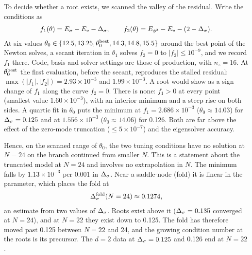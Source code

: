 To decide whether a root exists, we scanned the valley of the residual. Write the conditions as
\begin{equation}
 f_1(\theta)=E_\sigma-E_v-\Delta_\sigma,\qquad f_2(\theta)=E_{\phi^3}-E_v-(2-\Delta_\sigma).
\end{equation}
At six values $\theta_0\in\{12.5,13.25,\theta_0^{\rm best},14.3,14.8,15.5\}$ around the best point of the Newton solves,
a secant iteration in $\theta_1$ solves $f_2=0$ to $|f_2|\le10^{-9}$, and we record $f_1$ there. Code, basis and solver
settings are those of production, with $n_z=16$. At $\theta_0^{\rm best}$ the first evaluation, before the secant,
reproduces the stalled residual: $\max(|f_1|,|f_2|)=2.93\times10^{-3}$ and $1.99\times10^{-3}$. A root would show as a
sign change of $f_1$ along the curve $f_2=0$. There is none: $f_1>0$ at every point (smallest value
$1.60\times10^{-3}$), with an interior minimum and a steep rise on both sides. A quartic fit in $\theta_0$ puts the
minimum at $f_1=2.686\times10^{-3}$ ($\theta_0\approx14.03$) for $\Delta_\sigma=0.125$ and at $1.556\times10^{-3}$
($\theta_0\approx14.06$) for 0.126. Both are far above the effect of the zero-mode truncation ($\le5\times10^{-7}$) and
the eigensolver accuracy.

Hence, on the scanned range of $\theta_0$, the two tuning conditions have no solution at $N=24$ on the branch continued
from smaller $N$. This is a statement about the truncated model at $N=24$ and involves no extrapolation in $N$. The
minimum falls by $1.13\times10^{-3}$ per $0.001$ in $\Delta_\sigma$. Near a saddle-node (fold) it is linear in the parameter,
which places the fold at
\begin{equation}
 \Delta_\sigma^{\rm fold}(N=24)\approx0.1274,
\end{equation}
an estimate from two values of $\Delta_\sigma$. Roots exist above it ($\Delta_\sigma=0.135$ converged at $N=24$), and at $N=22$ they exist
down to 0.125. The fold has therefore moved past 0.125 between $N=22$ and 24, and the growing condition number at the
roots is its precursor. The $d=2$ data at $\Delta_\sigma=0.125$ and 0.126 end at $N=22$.

